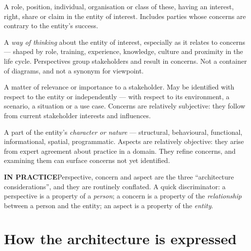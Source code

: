 \documentclass[11pt,a4paper]{report}
\newcommand{\calloutlead}[2]{{\sffamily\bfseries\footnotesize\color{#1}#2\quad}}
\newcommand{\tip}[1]{\begin{tipbox}\calloutlead{teal}{IN PRACTICE}#1\end{tipbox}}
\begin{document}
\begin{description}[style=nextline,leftmargin=6mm,labelindent=0pt,font=\sffamily\bfseries\color{navy}]
\item[Stakeholder]
  A role, position, individual, organisation or class of these, having an
  interest, right, share or claim in the entity of interest. Includes parties
  whose concerns are contrary to the entity's success.
\item[Stakeholder perspective]
  A \emph{way of thinking} about the entity of interest, especially as it
  relates to concerns --- shaped by role, training, experience, knowledge,
  culture and proximity in the life cycle. Perspectives group stakeholders and
  result in concerns. Not a container of diagrams, and not a synonym for
  viewpoint.
\item[Concern]
  A matter of relevance or importance to a stakeholder. May be identified with
  respect to the entity or independently --- with respect to its environment, a
  scenario, a situation or a use case. Concerns are relatively subjective:
  they follow from current stakeholder interests and influences.
\item[Aspect]
  A part of the entity's \emph{character or nature} --- structural, behavioural,
  functional, informational, spatial, programmatic. Aspects are relatively
  objective: they arise from expert agreement about practice in a domain. They
  refine concerns, and examining them can surface concerns not yet identified.
\end{description}

\tip{Perspective, concern and aspect are the three ``architecture
considerations'', and they are routinely conflated. A quick discriminator: a
perspective is a property of a \emph{person}; a concern is a property of the
\emph{relationship} between a person and the entity; an aspect is a property of
the \emph{entity}.}

\section{How the architecture is expressed}
\end{document}
